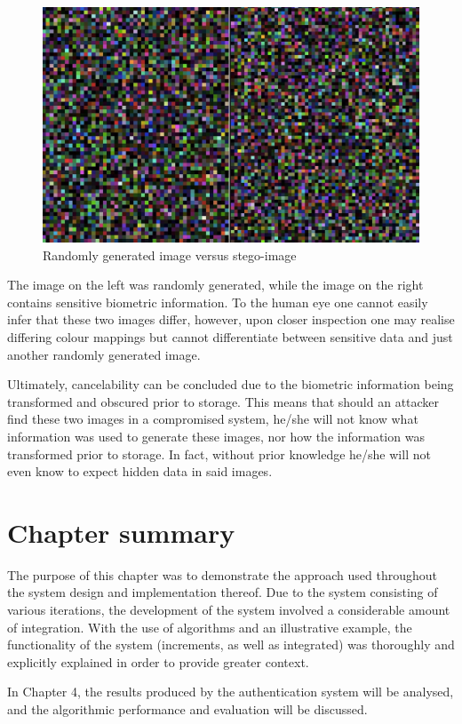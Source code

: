     
    \begin{figure}[htbp!] 
    \centering    
    \includegraphics[width=1.0\textwidth]{Chapter3/Figs/Figure3-7.png}
    \caption[Randomly generated image versus stego-image]{Randomly generated image versus stego-image}
    \label{fig:Randomly generated image versus stego-image}
    \end{figure}

The image on the left was randomly generated, while the image on the right contains sensitive biometric information. To the human eye one cannot easily infer that these two images differ, however, upon closer inspection one may realise differing colour mappings but cannot differentiate between sensitive data and just another randomly generated image.

Ultimately, cancelability can be concluded due to the biometric information being transformed and obscured prior to storage. This means that should an attacker find these two images in a compromised system, he/she will not know what information was used to generate these images, nor how the information was transformed prior to storage. In fact, without prior knowledge he/she will not even know to expect hidden data in said images.

\section{Chapter summary}

The purpose of this chapter was to demonstrate the approach used throughout the system design and implementation thereof. Due to the system consisting of various iterations, the development of the system involved a considerable amount of integration. With the use of algorithms and an illustrative example, the functionality of the system (increments, as well as integrated) was thoroughly and explicitly explained in order to provide greater context. 

In Chapter 4, the results produced by the authentication system will be analysed, and the algorithmic performance and evaluation will be discussed.

